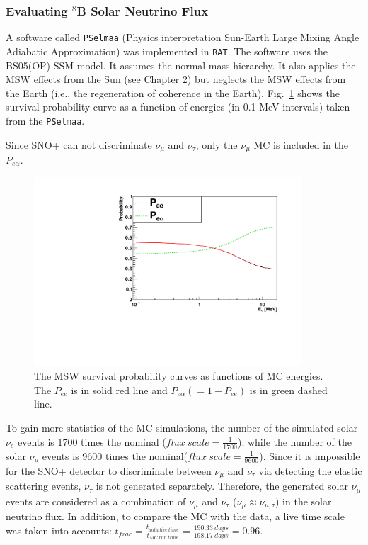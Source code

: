 \subsubsection{Evaluating $^8$B Solar Neutrino Flux}

A software called \texttt{PSelmaa} (Physics interpretation Sun-Earth Large Mixing Angle Adiabatic
Approximation) was implemented in \texttt{RAT}\cite{fady_pselmaa}. The software uses the BS05(OP) SSM model. It assumes the normal mass hierarchy. It also applies the MSW effects from the Sun (see Chapter 2) but neglects the MSW effects from the Earth (i.e., the regeneration of coherence in the Earth). Fig.~\ref{fig:pselmaa_curves} shows the survival probability curve as a function of energies (in 0.1 MeV intervals) taken from the \texttt{PSelmaa}.

Since SNO+ can not discriminate $\nu_\mu$ and $\nu_\tau$, only the $\nu_\mu$ MC is included in the $P_{e\alpha}$.

\begin{figure}[!htb]
	\centering
	\includegraphics[width=10cm]{PSelmaa_bs05op.pdf}
	\caption[The MSW survival probability curves as functions of MC energies.]{The MSW survival probability curves as functions of MC energies. The $P_{ee}$ is in solid red line and $P_{e\alpha}(=1-P_{ee})$ is in green dashed line.}
	\label{fig:pselmaa_curves}
\end{figure}


To gain more statistics of the MC simulations, the number of the simulated solar $\nu_e$ events is 1700 times the nominal ($flux~scale = \frac{1}{1700}$); while the number of the solar $\nu_\mu$ events is 9600 times the nominal($flux~scale=\frac{1}{9600}$). Since it is impossible for the SNO+ detector to discriminate between $\nu_\mu$ and $\nu_\tau$ via detecting the elastic scattering events, $\nu_\tau$ is not generated separately. Therefore, the generated solar $\nu_\mu$ events are considered as a combination of $\nu_\mu$ and $\nu_\tau$ ($\nu_\mu\approx\nu_{\mu,\tau}$) in the solar neutrino flux. In addition, to compare the MC with the data, a live time scale was taken into accounts: $t_{frac}=\frac{t_{data~live~time}}{t_{MC~run~time}}=\frac{190.33~days}{198.17~days} = 0.96$.

